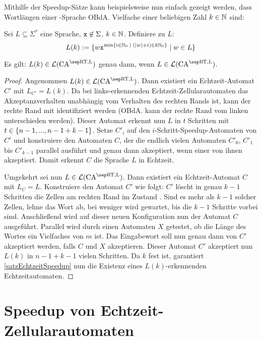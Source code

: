 Mithilfe der Speedup-Sätze kann beispielsweise nun einfach gezeigt werden,
dass Wortlängen einer \CAM{\CART, \CALeft}-Sprache \acs{OBdA.} Vielfache einer beliebigen Zahl $k \in \mathbb{N}$ sind:
\begin{satz}
    \label{wrtRealtimeLengthIdeal}
    Sei $L \subseteq \Sigma^*$ eine Sprache, $\texttt{x} \not\in \Sigma$, $k \in \mathbb{N}$.
    Definiere zu $L$:
    \[
        L(k) := \{ { w \texttt{x}^{\min \{ {i \in \mathbb{N}_0 } \; | \; { (|w| + i) \in k\mathbb{N}_0 } \}} } \; | \; { w \in L } \}
    \]
    
    Es gilt: $L(k) \in \CAL{\CART, \CALeft}$ genau dann, wenn $L \in \CAL{\CART, \CALeft}$.
\end{satz}
\begin{proof}
    Angenommen $L(k) \in \CAL{\CART, \CALeft}$.
    Dann existiert ein Echtzeit-Automat $C'$
    mit $L_{C'} = L(k)$.
    Da bei links-erkennenden Echtzeit-Zellularautomaten
    das Akzeptanzverhalten unabhängig vom Verhalten des rechten
    Rands ist, kann der rechte Rand mit  identifiziert werden (\acs{OBdA.} kann der rechte Rand vom linken unterschieden werden).
    Dieser Automat erkennt nun $L$
    in $t$ Schritten mit $t \in \{ {n-1, ..., n-1+k-1} \}$.
    Setze $C'_i$ auf den $i$-Schritt-Speedup-Automaten von $C'$
    und konstruiere den Automaten $C$, der die endlich vielen Automaten
    $C'_0$, $C'_1$ bis $C'_{k-1}$ parallel ausführt und genau
    dann akzeptiert, wenn einer von ihnen akzeptiert.
    Damit erkennt $C$ die Sprache $L$ in Echtzeit.
    
    Umgekehrt sei nun $L \in \CAL{\CART, \CALeft}$.
    Dann existiert ein Echtzeit-Automat $C$
    mit $L_C = L$.
    Konstruiere den Automat $C'$ wie folgt:
    $C'$ löscht in genau $k-1$ Schritten die
    Zellen am rechten Rand im Zustand .
    Sind es mehr als $k-1$ solcher Zellen, lehne das Wort ab, bei weniger
    wird gewartet, bis die $k-1$ Schritte vorbei sind.
    Anschließend wird auf dieser neuen Konfiguration
    nun der Automat $C$ ausgeführt.
    Parallel wird durch einen Automaten $X$ getestet,
    ob die Länge des Wortes ein Vielfaches von $m$ ist.
    Das Eingabewort soll nun genau dann von $C'$ akzeptiert werden,
    falls $C$ und $X$ akzeptieren.
    Dieser Automat $C'$ akzeptiert nun $L(k)$ in $n-1+k-1$
    vielen Schritten.
    Da $k$ fest ist, garantiert \cref{satzEchtzeitSpeedup}
    nun die Existenz eines $L(k)$-erkennenden Echtzeitautomaten.
\end{proof}


\section{Speedup von Echtzeit-Zellularautomaten}

